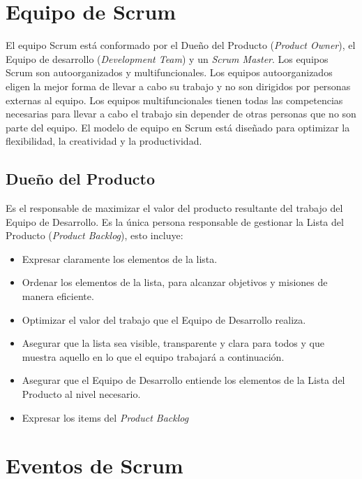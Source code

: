 \section{Equipo de Scrum}

El equipo Scrum está conformado por el Dueño del Producto (\textit{Product Owner}), el Equipo de desarrollo (\textit{Development Team}) y un \textit{Scrum Master}. Los equipos Scrum son autoorganizados y multifuncionales. Los equipos autoorganizados eligen la mejor forma de llevar a cabo su trabajo y no son dirigidos por personas externas al equipo. Los equipos multifuncionales tienen todas las competencias necesarias para llevar a cabo el trabajo sin depender de otras personas que no son parte del equipo. El modelo de equipo en Scrum está diseñado para optimizar la flexibilidad, la creatividad y la productividad. \cite{scrumSchwaber}

\subsection{Dueño del Producto}
Es el responsable de maximizar el valor del producto resultante del trabajo del Equipo de Desarrollo. Es la única persona responsable de gestionar la Lista del Producto (\textit{Product Backlog}), esto incluye:
\begin{itemize}
\item Expresar claramente los elementos de la lista.
\item Ordenar los elementos de la lista, para alcanzar objetivos y misiones de manera eficiente.
	\item Optimizar el valor del trabajo que el Equipo de Desarrollo realiza.
	\item Asegurar que la lista sea visible, transparente y clara para todos y que muestra aquello en lo que el equipo trabajará a continuación.
	\item Asegurar que el Equipo de Desarrollo entiende los elementos de la Lista del Producto al nivel necesario.
\end{itemize}

\begin{itemize}
    \item Expresar los items del \emph{Product Backlog}
\end{itemize}

\section{Eventos de Scrum}

